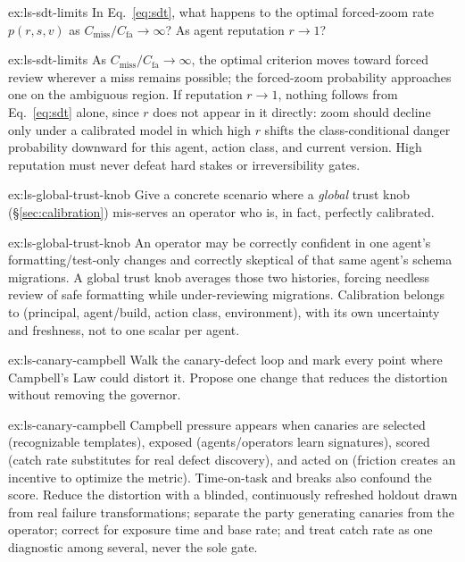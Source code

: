 \documentclass[11pt,a4paper]{article}
\theoremstyle{definition}
\theoremstyle{plain}
\begin{document}
\begin{pdexercise}[kind=Check,rating=1]{ex:ls-sdt-limits}
In Eq.~\ref{eq:sdt}, what happens to the optimal forced-zoom rate $p(r,s,v)$ as
$C_{\text{miss}}/C_{\text{fa}}\to\infty$? As agent reputation $r\to 1$?
\end{pdexercise}
\begin{pdsolution}{ex:ls-sdt-limits}
As $C_{\mathrm{miss}}/C_{\mathrm{fa}}\to\infty$, the optimal criterion moves toward forced review wherever a miss remains possible; the forced-zoom probability approaches one on the ambiguous region. If reputation $r\to1$, nothing follows from Eq.~\ref{eq:sdt} alone, since $r$ does not appear in it directly: zoom should decline only under a calibrated model in which high $r$ shifts the class-conditional danger probability downward for this agent, action class, and current version. High reputation must never defeat hard stakes or irreversibility gates.
\end{pdsolution}
\begin{pdexercise}[kind=Check,rating=1]{ex:ls-global-trust-knob}
Give a
concrete scenario where a \emph{global} trust knob (\S\ref{sec:calibration})
mis-serves an operator who is, in fact, perfectly calibrated.
\end{pdexercise}
\begin{pdsolution}{ex:ls-global-trust-knob}
An operator may be correctly confident in one agent's formatting/test-only changes and correctly skeptical of that same agent's schema migrations. A global trust knob averages those two histories, forcing needless review of safe formatting while under-reviewing migrations. Calibration belongs to (principal, agent/build, action class, environment), with its own uncertainty and freshness, not to one scalar per agent.
\end{pdsolution}
\begin{pdexercise}[kind=Trace,rating=2]{ex:ls-canary-campbell}
Walk the canary-defect loop and mark every point where Campbell's Law could
distort it. Propose one change that reduces the distortion without removing the
governor.
\end{pdexercise}
\begin{pdsolution}{ex:ls-canary-campbell}
Campbell pressure appears when canaries are selected (recognizable templates), exposed (agents/operators learn signatures), scored (catch rate substitutes for real defect discovery), and acted on (friction creates an incentive to optimize the metric). Time-on-task and breaks also confound the score. Reduce the distortion with a blinded, continuously refreshed holdout drawn from real failure transformations; separate the party generating canaries from the operator; correct for exposure time and base rate; and treat catch rate as one diagnostic among several, never the sole gate.
\end{pdsolution}
\end{document}
